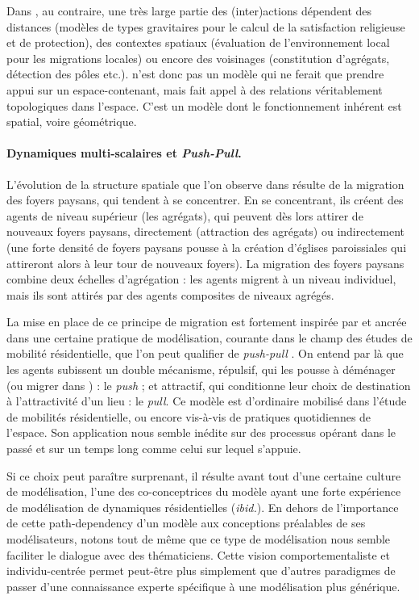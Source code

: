 Dans \simfeodal{}, au contraire, une très large partie des (inter)actions dépendent des distances (modèles de types gravitaires pour le calcul de la satisfaction religieuse et de protection), des contextes spatiaux (évaluation de l'environnement local pour les migrations locales) ou encore des voisinages (constitution d'agrégats, détection des pôles etc.).
\simfeodal{} n'est donc pas un modèle qui ne ferait que prendre appui sur un espace-contenant, mais fait appel à des relations véritablement topologiques dans l'espace.
C'est un modèle dont le fonctionnement inhérent est spatial, voire géométrique.

\paragraph{Dynamiques multi-scalaires et \textit{Push-Pull}.}

L'évolution de la structure spatiale que l'on observe dans \simfeodal{} résulte de la migration des foyers paysans, qui tendent à se concentrer.
En se concentrant, ils créent des agents de niveau supérieur (les agrégats), qui peuvent dès lors attirer de nouveaux foyers paysans, directement (attraction des agrégats) ou indirectement (une forte densité de foyers paysans pousse à la création d'églises paroissiales qui attireront alors à leur tour de nouveaux foyers).
La migration des foyers paysans combine deux échelles d'agrégation :
	les agents migrent à un niveau individuel, mais ils sont attirés par des agents composites de niveaux agrégés.

La mise en place de ce principe de migration est fortement inspirée par et ancrée dans une certaine pratique de modélisation, courante dans le champ des études de mobilité résidentielle, que l'on peut qualifier de \og \textit{push-pull}\fg{} \autocite{tannier_analyse_2017}.
On entend par là que les agents subissent un double mécanisme, répulsif, qui les pousse à déménager (ou migrer dans \simfeodal{} ) : le \textit{push} ; et attractif, qui conditionne leur choix de destination à l'attractivité d'un lieu : le \textit{pull}.
Ce modèle est d'ordinaire mobilisé dans l'étude de mobilités résidentielle, ou encore vis-à-vis de pratiques quotidiennes de l'espace.
Son application nous semble inédite sur des processus opérant dans le passé et sur un temps long comme celui sur lequel \simfeodal{} s'appuie.

Si ce choix peut paraître surprenant, il résulte avant tout d'une certaine \og culture de modélisation\fg{}, l'une des co-conceptrices du modèle ayant une forte expérience de modélisation de dynamiques résidentielles (\textit{ibid.}).
En dehors de l'importance de cette \og path-dependency\fg{} d'un modèle aux conceptions préalables de ses modélisateurs, notons tout de même que ce type de modélisation nous semble faciliter le dialogue avec des thématiciens.
Cette vision \og comportementaliste\fg{} et individu-centrée permet peut-être plus simplement que d'autres paradigmes de passer d'une connaissance experte spécifique à une modélisation plus générique.

